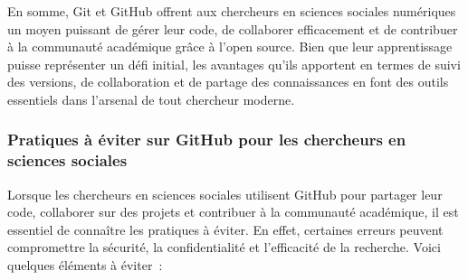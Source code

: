 \documentclass[
  letterpaper,
]{scrbook}
\begin{document}
En somme, Git et GitHub offrent aux chercheurs en sciences sociales
numériques un moyen puissant de gérer leur code, de collaborer
efficacement et de contribuer à la communauté académique grâce à l'open
source. Bien que leur apprentissage puisse représenter un défi initial,
les avantages qu'ils apportent en termes de suivi des versions, de
collaboration et de partage des connaissances en font des outils
essentiels dans l'arsenal de tout chercheur moderne.

\hypertarget{pratiques-uxe0-uxe9viter-sur-github-pour-les-chercheurs-en-sciences-sociales}{%
\subsubsection{Pratiques à éviter sur GitHub pour les chercheurs en
sciences
sociales}\label{pratiques-uxe0-uxe9viter-sur-github-pour-les-chercheurs-en-sciences-sociales}}

Lorsque les chercheurs en sciences sociales utilisent GitHub pour
partager leur code, collaborer sur des projets et contribuer à la
communauté académique, il est essentiel de connaître les pratiques à
éviter. En effet, certaines erreurs peuvent compromettre la sécurité, la
confidentialité et l'efficacité de la recherche. Voici quelques éléments
à éviter~:
\end{document}
